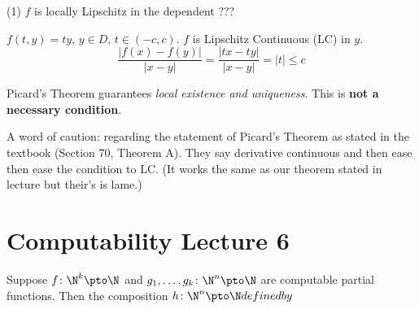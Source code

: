 \documentclass[class=article, crop=false]{standalone}
\begin{document}
\begin{rem}
    (1) $f$ is locally Lipschitz in the dependent ???
\end{rem}

\begin{ex}
    $f(t,y) = ty$, $y \in D$, $t \in (-c,c)$. $f$ is Lipschitz Continuous (LC) in $y$.
        \[
            \frac{|f(x)-f(y)|}{|x-y|} = \frac{|tx-ty|}{|x-y|} = |t| \leq c
        \]
\end{ex}

\begin{rem}
    Picard's Theorem guarantees \textit{local existence and uniqueness}. This is \textbf{not a necessary condition}.
\end{rem}

\begin{rem}
    A word of caution: regarding the statement of Picard's Theorem as stated in the textbook (Section 70, Theorem A). They say derivative continuous and then ease then ease the condition to LC. (It works the same as our theorem stated in lecture but their's is lame.)
\end{rem}











\newpage
\section{Computability Lecture 6}

\begin{thm}[Substitution]
    Suppose $f \colon \N^k \pto \N$ and $g_1, \ldots, g_k \colon \N^n \pto \N$ are computable partial functions. Then the composition $h \colon \N^n \pto \N defined by $
\end{thm}
\end{document}

